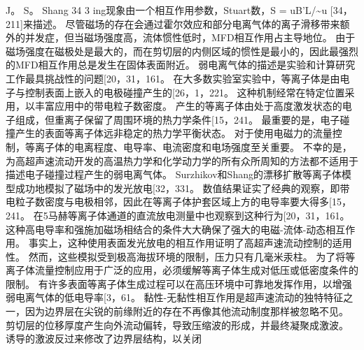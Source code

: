 \documentclass[UTF8,11pt,a4paper,openany,fontset=fandol]{ctexbook}
\begin{document}
J。 S。 Shang 34 3 ing现象由一个相互作用参数，Stuart数，S = uB'L/\textasciitilde{}u [34，211]来描述。 尽管磁场的存在会通过霍尔效应和部分电离气体的离子滑移带来额外的并发症，但当磁场强度高，流体惯性低时，MFD相互作用占主导地位。 由于磁场强度在磁极处是最大的，而在剪切层的内侧区域的惯性是最小的，因此最强烈的MFD相互作用总是发生在固体表面附近。 弱电离气体的描述是实验和计算研究工作最具挑战性的问题[20，31，161。 在大多数实验室实验中，等离子体是由电子与控制表面上嵌入的电极碰撞产生的[26，1，221。 这种机制经常在特定位置采用，以丰富应用中的带电粒子数密度。 产生的等离子体由处于高度激发状态的电子组成，但重离子保留了周围环境的热力学条件[15，241。 最重要的是，电子碰撞产生的表面等离子体远非稳定的热力学平衡状态。 对于使用电磁力的流量控制，等离子体的电离程度、电导率、电流密度和电场强度至关重要。 不幸的是，为高超声速流动开发的高温热力学和化学动力学的所有众所周知的方法都不适用于描述电子碰撞过程产生的弱电离气体。 Surzhikov和Shang的漂移扩散等离子体模型成功地模拟了磁场中的发光放电[32，331。 数值结果证实了经典的观察，即带电粒子数密度与电极相邻，因此在等离子体护套区域上方的电导率要大得多[15，241。 在5马赫等离子体通道的直流放电测量中也观察到这种行为[20，31，161。 这种高电导率和强施加磁场相结合的条件大大确保了强大的电磁-流体-动态相互作用。 事实上，这种使用表面发光放电的相互作用证明了高超声速流动控制的适用性。 然而，这些模拟受到极高海拔环境的限制，压力只有几毫米汞柱。 为了将等离子体流量控制应用于广泛的应用，必须缓解等离子体生成对低压或低密度条件的限制。 有许多表面等离子体生成过程可以在高压环境中可靠地发挥作用，以增强弱电离气体的低电导率[3，61。 黏性-无黏性相互作用是超声速流动的独特特征之一，因为边界层在尖锐的前缘附近的存在不再像其他流动制度那样被忽略不见。 剪切层的位移厚度产生向外流动偏转，导致压缩波的形成，并最终凝聚成激波。 诱导的激波反过来修改了边界层结构，以关闭
\end{document}
